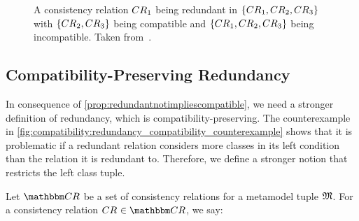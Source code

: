 \begin{figure}
    \centering
    
    \caption[Incompatibility with redundant consistency relation]{A consistency relation $\consistencyrelation{CR}{1}$ being redundant in  $\setted{\consistencyrelation{CR}{1}, \consistencyrelation{CR}{2}, \consistencyrelation{CR}{3}}$ with $\setted{\consistencyrelation{CR}{2}, \consistencyrelation{CR}{3}}$ being compatible and $\setted{\consistencyrelation{CR}{1}, \consistencyrelation{CR}{2},\consistencyrelation{CR}{3}}$ being incompatible. Taken from~.}
    \label{fig:compatibility:redundancy_compatibility_counterexample}
\end{figure}

\subsection{Compatibility-Preserving Redundancy}

In consequence of \autoref{prop:redundantnotimpliescompatible}, we need a stronger definition of redundancy, which is compatibility-preserving. 
The counterexample in \autoref{fig:compatibility:redundancy_compatibility_counterexample} shows that it is problematic if a redundant relation considers more classes in its left condition than the relation it is redundant to.
Therefore, we define a stronger notion that restricts the left class tuple.

\begin{definition} \label{def:leftequalredundancy}
    Let $\consistencyrelationset{CR}$ be a set of consistency relations for a metamodel tuple $\metamodeltuple{M}$.
    For a consistency relation $\consistencyrelation{CR}{} \in \consistencyrelationset{CR}$, we say:
\end{definition}

